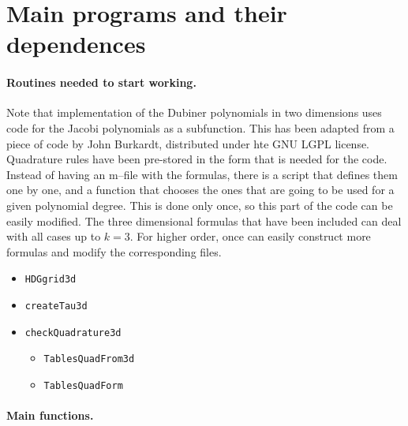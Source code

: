 \documentclass[10pt,english]{article}
\begin{document}


\section{Main programs and their dependences}

\paragraph{Routines needed to start working.} Note that implementation of the Dubiner polynomials in two dimensions uses code for the Jacobi polynomials as a subfunction. This has been adapted from a piece of code by John Burkardt, distributed under hte GNU LGPL license. Quadrature rules have been pre-stored in the form that is needed for the code. Instead of having an m--file with the formulas, there is a script that defines them one by one, and a function that chooses the ones that are going to be used for a given polynomial degree. This is done only once, so this part of the code can be easily modified. The three dimensional formulas that have been included can deal with all cases up to $k=3$. For higher order, once can easily construct more formulas and modify the corresponding files.

\begin{itemize}
\item {\tt HDGgrid3d}
\item {\tt createTau3d}
\item {\tt checkQuadrature3d}
\begin{itemize}
\item {\tt TablesQuadFrom3d}
\item {\tt TablesQuadForm}
\end{itemize}
\end{itemize}


\paragraph{Main functions.} 
\end{document}
